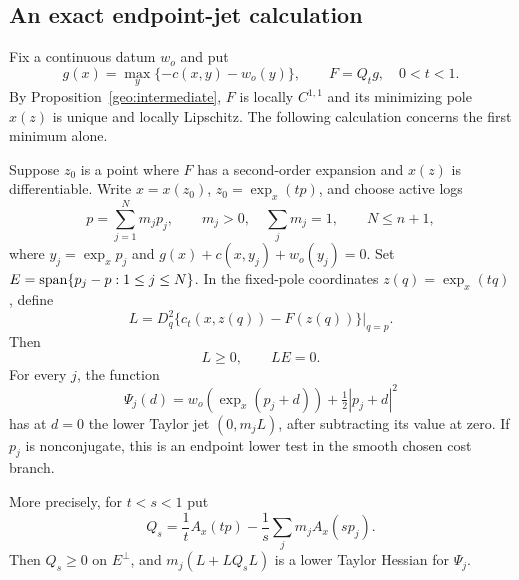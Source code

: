 \subsection{An exact endpoint-jet calculation}

Fix a continuous datum $w_o$ and put
\[
 g(x)=\max_y\{-c(x,y)-w_o(y)\},\qquad F=Q_tg,\quad 0<t<1.
\]
By Proposition~\ref{geo:intermediate}, $F$ is locally $C^{1,1}$ and its
minimizing pole $x(z)$ is unique and locally Lipschitz. The following
calculation concerns the first minimum alone.

\begin{lemma}
\label{jet:transfer}
Suppose $z_0$ is a point where $F$ has a second-order expansion and
$x(z)$ is differentiable. Write $x=x(z_0)$,
$z_0=\exp_x(tp)$, and choose active logs
\[
 p=\sum_{j=1}^Nm_jp_j,\qquad m_j>0,\quad
 \sum_jm_j=1,\qquad N\le n+1,
\]
where $y_j=\exp_xp_j$ and
$g(x)+c(x,y_j)+w_o(y_j)=0$. Set
$E=\operatorname{span}\{p_j-p:1\le j\le N\}$. In the fixed-pole coordinates
$z(q)=\exp_x(tq)$, define
\begin{equation}\label{jet:L-definition}
 L=D_q^2\{c_t(x,z(q))-F(z(q))\}\big|_{q=p}.
\end{equation}
Then
\begin{equation}\label{jet:L-properties}
 L\ge0,\qquad LE=0.
\end{equation}
For every $j$, the function
\[
 \Psi_j(d)=w_o(\exp_x(p_j+d))+\tfrac12|p_j+d|^2
\]
has at $d=0$ the lower Taylor jet $(0,m_jL)$, after subtracting
its value at zero. If $p_j$ is nonconjugate, this is an endpoint
lower test in the smooth chosen cost branch.

More precisely, for $t<s<1$ put
\[
 Q_s=\frac1tA_x(tp)-\frac1s\sum_jm_j A_x(sp_j).
\]
Then $Q_s\ge0$ on $E^\perp$, and
$m_j(L+LQ_sL)$ is a lower Taylor Hessian for $\Psi_j$.
\end{lemma}

